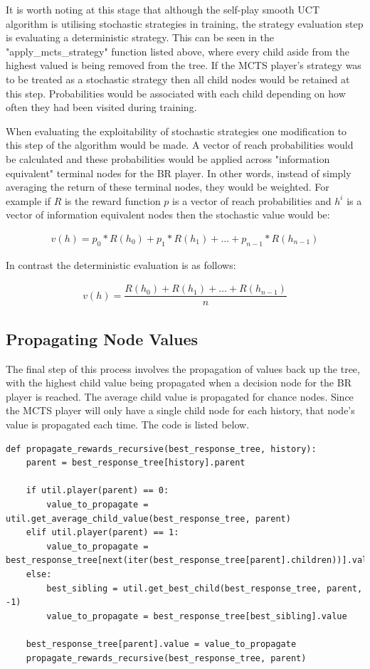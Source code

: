 It is worth noting at this stage that although the self-play smooth UCT algorithm is utilising
stochastic strategies in training, the strategy evaluation step is evaluating a deterministic strategy.
This can be seen in the "apply\_mcts\_strategy" function listed above, where every
child aside from the highest valued is being removed from the tree.
If the MCTS player's strategy was to be treated as a stochastic strategy then all child
nodes would be retained at this step.
Probabilities would be associated with each child depending on how often they had been visited during training.

When evaluating the exploitability of stochastic strategies one
modification to this step of the algorithm would be made.
A vector of reach probabilities\citep{johanson2011accelerating} would be calculated and these probabilities would
be applied across "information equivalent" terminal nodes for the BR player.
In other words, instead of simply averaging the return of these terminal nodes, they would be weighted.
For example if $R$ is the reward function $p$ is a vector of reach probabilities and
$h^i$ is a vector of information equivalent nodes then the stochastic value would be:

\begin{align}
    v(h) = p_0*R(h_0) + p_1*R(h_1) + \dots + p_{n-1}*R(h_{n-1})
\end{align}

In contrast the deterministic evaluation is as follows:

\begin{align}
    v(h) = \dfrac{R(h_0) + R(h_1) + \dots + R(h_{n-1})}{n}
\end{align}

\subsection{Propagating Node Values}\label{subsec:propagateTerminals}
The final step of this process involves the propagation of values back up the tree, with the highest
child value being propagated when a decision node for the BR player is reached.
The average child value is propagated for chance nodes.
Since the MCTS player will only have a single child node for each history, that node's value is
propagated each time.
The code is listed below.

\begin{lstlisting}[style=Python]
def propagate_rewards_recursive(best_response_tree, history):
    parent = best_response_tree[history].parent

    if util.player(parent) == 0:
        value_to_propagate = util.get_average_child_value(best_response_tree, parent)
    elif util.player(parent) == 1:
        value_to_propagate = best_response_tree[next(iter(best_response_tree[parent].children))].value
    else:
        best_sibling = util.get_best_child(best_response_tree, parent, -1)
        value_to_propagate = best_response_tree[best_sibling].value

    best_response_tree[parent].value = value_to_propagate
    propagate_rewards_recursive(best_response_tree, parent)
\end{lstlisting}


